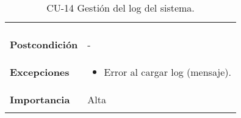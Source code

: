 \begin{longtable}[h!]{@{}ll@{}}
\begin{minipage}[t]{0.71\columnwidth}
\begin{enumerate}
\end{enumerate}\strut
\end{minipage}\tabularnewline
\begin{minipage}[t]{0.23\columnwidth}\raggedright\strut
\textbf{Postcondición}\strut
\end{minipage} & \begin{minipage}[t]{0.71\columnwidth}\raggedright\strut
-\strut
\end{minipage}\tabularnewline
\begin{minipage}[t]{0.23\columnwidth}\raggedright\strut
\textbf{Excepciones}\strut
\end{minipage} & \begin{minipage}[t]{0.71\columnwidth}\raggedright\strut
\begin{itemize}
\tightlist
\item
  Error al cargar log (mensaje).
\end{itemize}\strut
\end{minipage}\tabularnewline
\begin{minipage}[t]{0.23\columnwidth}\raggedright\strut
\textbf{Importancia}\strut
\end{minipage} & \begin{minipage}[t]{0.71\columnwidth}\raggedright\strut
Alta\strut
\end{minipage}\tabularnewline
\bottomrule
\caption{CU-14 Gestión del log del sistema.}
\end{longtable}


